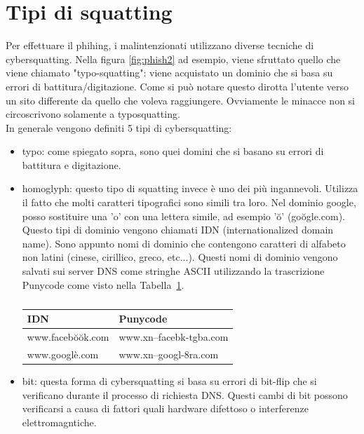 \section{Tipi di squatting}
Per effettuare il phihing, i malintenzionati utilizzano diverse tecniche di cybersquatting. Nella figura \ref{fig:phish2} ad esempio, viene sfruttato quello che viene chiamato "typo-squatting": viene acquistato un dominio che si basa su errori di battitura/digitazione. Come si può notare questo dirotta l'utente verso un sito differente da quello che voleva raggiungere.
Ovviamente le minacce non si circoscrivono solamente a typosquatting.\\
In generale vengono definiti 5 tipi di cybersquatting:
\begin{itemize}
    \item typo: come spiegato sopra, sono quei domini che si basano su errori di battitura e digitazione.
    
    \item homoglyph: questo tipo di squatting invece è uno dei più ingannevoli. Utilizza il fatto che molti caratteri tipografici sono simili tra loro. Nel dominio google, posso sostituire una 'o' con una lettera simile, ad esempio 'ŏ' (goŏgle.com).\\
    Questo tipi di dominio vengono chiamati IDN (internationalized domain name). Sono appunto nomi di dominio che contengono caratteri di alfabeto non latini (cinese, cirillico, greco, etc...). Questi nomi di dominio vengono salvati sui server DNS come stringhe ASCII utilizzando la trascrizione Punycode come visto nella Tabella~\ref{table:tab1}.
    \begin{table}[!h]
        \centering
        \caption{}
        \begin{tabular}{|l|l|}
        \hline
            IDN              & Punycode                     \\ \hline
            www.facebŏŏk.com & www.xn--facebk-tgba.com      \\
            www.googlè.com   & www.xn--googl-8ra.com        \\
        \hline
        \end{tabular}
        \label{table:tab1}
    \end{table}
    
    \item bit: questa forma di cybersquatting si basa su errori di bit-flip che si verificano durante il processo di richiesta DNS. Questi cambi di bit possono verificarsi a causa di fattori quali hardware difettoso o interferenze elettromagntiche.
    

\end{itemize}
